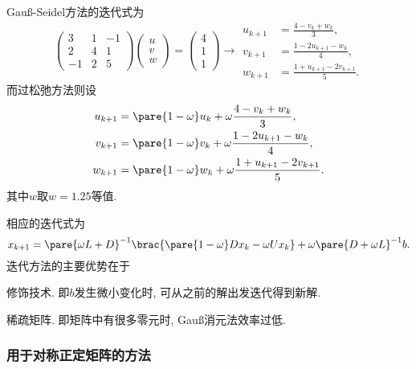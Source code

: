 \documentclass[20pt]{extarticle}
\begin{document}
\begin{ex}
    Gau\ss-Seidel方法的迭代式为
    \[ \begin{pmatrix}
        3 & 1 & -1 \\ 2 & 4 & 1 \\ -1 & 2 & 5
    \end{pmatrix}\begin{pmatrix}
        u \\ v \\ w
    \end{pmatrix} = \begin{pmatrix}
        4 \\ 1 \\ 1
    \end{pmatrix} \longrightarrow \begin{aligned}
        u_{k+1} &= \frac{4-v_k+w_k}{3}, \\
        v_{k+1} &= \frac{1-2u_{k+1} - w_k}{4}, \\
        w_{k+1} &= \frac{1+u_{k+1}-2v_{k+1}}{5}.
    \end{aligned} \]
    而过松弛方法则设
    \begin{align*}
        u_{k+1} &= \pare{1-\omega}u_k + \omega\frac{4-v_k+w_k}{3}, \\
        v_{k+1} &= \pare{1-\omega}v_k + \omega\frac{1-2u_{k+1} - w_k}{4}, \\
        w_{k+1} &= \pare{1-\omega}w_k + \omega\frac{1+u_{k+1}-2v_{k+1}}{5}.
    \end{align*}
    其中$w$取$w=1.25$等值.
\end{ex}
相应的迭代式为
\[ x_{k+1} = \pare{\omega L+D}^{-1}\brac{\pare{1-\omega}Dx_k-\omega Ux_k}+\omega\pare{D+\omega L}^{-1}b. \]
迭代方法的主要优势在于
\begin{cenum}
    \item 修饰技术. 即$b$发生微小变化时, 可从之前的解出发迭代得到新解.
    \item 稀疏矩阵. 即矩阵中有很多零元时, Gau\ss 消元法效率过低.
\end{cenum}


\subsubsection{用于对称正定矩阵的方法} %
\label{ssub:用于对称正定矩阵的方法}
\end{document}
